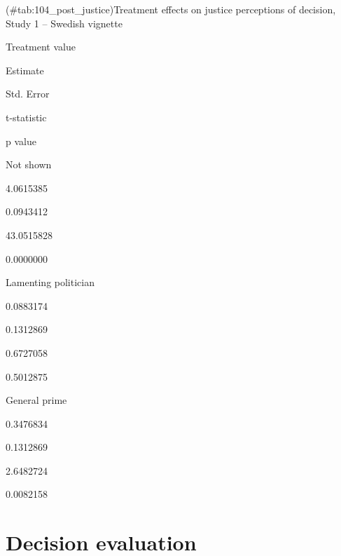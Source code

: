 \documentclass[]{book}
\begin{document}
(\#tab:104\_post\_justice)Treatment effects on justice perceptions of
decision, Study 1 -- Swedish vignette

Treatment value

Estimate

Std. Error

t-statistic

p value

Not shown

4.0615385

0.0943412

43.0515828

0.0000000

Lamenting politician

0.0883174

0.1312869

0.6727058

0.5012875

General prime

0.3476834

0.1312869

2.6482724

0.0082158

\section{Decision evaluation}\label{decision-evaluation}
\end{document}
